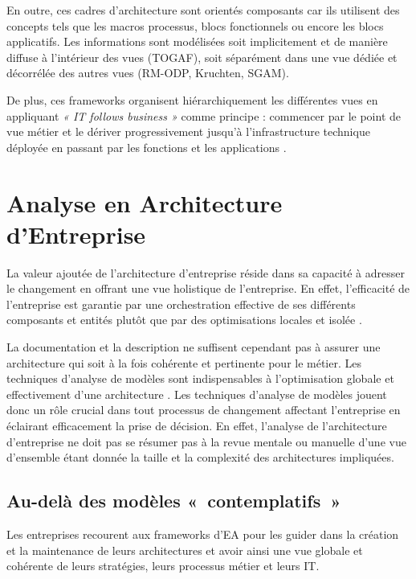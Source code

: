 En outre, ces cadres d'architecture sont orientés composants car ils utilisent des concepts tels que les macros processus, blocs fonctionnels ou encore les blocs applicatifs. Les informations sont modélisées soit implicitement et de manière diffuse à l'intérieur des vues (TOGAF), soit séparément dans une vue dédiée et décorrélée des autres vues (RM-ODP, Kruchten, SGAM).

De plus, ces frameworks organisent hiérarchiquement les différentes vues en appliquant \emph{« IT follows business »} comme principe : commencer par le point de vue métier et le dériver progressivement jusqu'à l'infrastructure technique déployée en passant par les fonctions et les applications \cite{winter2006essential}.


\section{Analyse en Architecture d'Entreprise}

La valeur ajoutée de l'architecture d'entreprise réside dans sa capacité à adresser le changement en offrant une vue holistique de l'entreprise. En effet, l'efficacité de l'entreprise  est garantie par une orchestration effective de ses différents composants et entités plutôt que par des optimisations locales et isolée \cite{nadler1992organizational}. 

La documentation et la description ne suffisent cependant pas à assurer une architecture qui soit à la fois cohérente et pertinente pour le métier. Les techniques d'analyse de modèles sont indispensables à l'optimisation globale et effectivement d'une architecture \cite{lankhorst2009enterprise}. Les techniques d'analyse de modèles jouent donc un rôle crucial dans tout processus de changement affectant l'entreprise en éclairant efficacement la prise de décision. En effet, l'analyse de l'architecture d'entreprise ne doit pas se résumer pas à la revue mentale ou manuelle d'une vue d'ensemble étant donnée la taille et la complexité des architectures impliquées.

	\subsection{Au-delà des modèles «~contemplatifs~»}

Les entreprises recourent aux frameworks d'EA pour les guider dans la création et la maintenance de leurs architectures et avoir ainsi une vue globale et cohérente de leurs stratégies, leurs processus métier et leurs IT.

